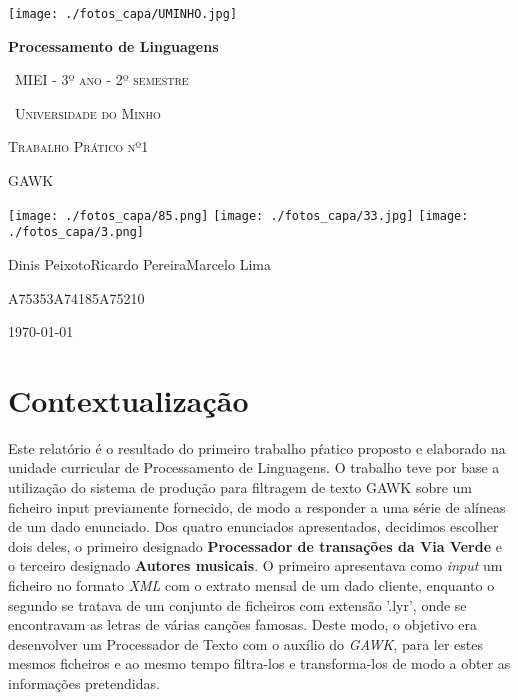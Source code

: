 \documentclass[12pt,a4paper]{report}
\begin{document}
\begin{titlepage}
	\centering
	\texttt{[image: ./fotos\_capa/UMINHO.jpg]}\par\vspace{1cm}
	{\huge\bfseries Processamento de Linguagens \par}
	\vspace{0.5cm}
	{\scshape\ MIEI - 3º ano - 2º semestre\par}
	\vspace{0.1cm}
	{\scshape\ Universidade do Minho\par}
	\vspace{5cm}
    {\scshape\LARGE Trabalho Prático nº1 \par}
    \vspace{0.5cm}
	{\scshape\LARGE GAWK \par}
    \vspace{5cm}
	\texttt{[image: ./fotos\_capa/85.png]}\hspace{2cm}
	\texttt{[image: ./fotos\_capa/33.jpg]}\hspace{2cm}
	\texttt{[image: ./fotos\_capa/3.png]}\par
    Dinis Peixoto\hspace{1.5cm}Ricardo Pereira\hspace{1.4cm}Marcelo Lima\par
	\noindent\textsc{A75353}\hspace{2.75cm}\textsc{A74185}\hspace{2.75cm}\textsc{A75210}

	\vfill
	{\large \today\par}
\end{titlepage}


\tableofcontents


\chapter{Contextualização}
Este relatório é o resultado do primeiro trabalho pŕatico proposto e elaborado na unidade curricular de Processamento de Linguagens. O trabalho teve por base a utilização do sistema de produção para filtragem de texto GAWK sobre um ficheiro input previamente fornecido, de modo a responder a uma série de alíneas de um dado enunciado. 
Dos quatro enunciados apresentados, decidimos escolher dois deles, o primeiro designado \textbf{Processador de transações da Via Verde} e o terceiro designado \textbf{Autores musicais}. O primeiro apresentava como \emph{input} um ficheiro no formato \emph{XML} com o extrato mensal de um dado cliente, enquanto o segundo se tratava de um conjunto de ficheiros com extensão '.lyr', onde se encontravam as letras de várias canções famosas. Deste modo, o objetivo era desenvolver um Processador de Texto com o auxílio do \emph{GAWK}, para ler estes mesmos ficheiros e ao mesmo tempo filtra-los e transforma-los de modo a obter as informações pretendidas.
\end{document}
